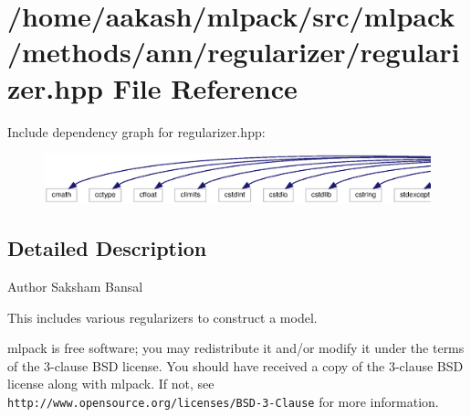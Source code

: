 \section{/home/aakash/mlpack/src/mlpack/methods/ann/regularizer/regularizer.hpp File Reference}
\label{regularizer_8hpp}
Include dependency graph for regularizer.\+hpp\+:
\nopagebreak
\begin{figure}[H]
\begin{center}
\leavevmode
\includegraphics[width=350pt]{regularizer_8hpp__incl}
\end{center}
\end{figure}


\subsection{Detailed Description}
\begin{DoxyAuthor}{Author}
Saksham Bansal
\end{DoxyAuthor}
This includes various regularizers to construct a model.

mlpack is free software; you may redistribute it and/or modify it under the terms of the 3-\/clause B\+SD license. You should have received a copy of the 3-\/clause B\+SD license along with mlpack. If not, see {\tt http\+://www.\+opensource.\+org/licenses/\+B\+S\+D-\/3-\/\+Clause} for more information. 